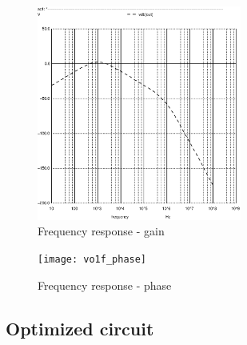 \begin{figure}[H]
\centering
\includegraphics[width=0.6\textwidth]{vo1f}
\caption{Frequency response - gain}
\end{figure}

\begin{figure}[H]
\centering
\texttt{[image: vo1f\_phase]}
\caption{Frequency response - phase}
\end{figure}

\subsection{Optimized circuit}

